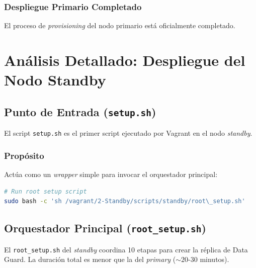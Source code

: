 \documentclass[11pt, a4paper]{report}
\begin{document}
\subsection{Despliegue Primario Completado}
El proceso de \textit{provisioning} del nodo primario está oficialmente completado.
\newpage


\chapter[Apéndice B: Despliegue Standby]{Análisis Detallado: Despliegue del Nodo Standby}

\section{Punto de Entrada (\texttt{setup.sh})}

El script \texttt{setup.sh} es el primer script ejecutado por Vagrant en el nodo \textit{standby}.
\subsection{Propósito}
Actúa como un \textit{wrapper} simple para invocar el orquestador principal:
\begin{lstlisting}[language=bash, caption={Invocación del Orquestador Standby}]
# Run root setup script
sudo bash -c 'sh /vagrant/2-Standby/scripts/standby/root\_setup.sh'
\end{lstlisting}

\section{Orquestador Principal (\texttt{root\_setup.sh})}

El \texttt{root\_setup.sh} del \textit{standby} coordina 10 etapas para crear la réplica de Data Guard.
La duración total es menor que la del \textit{primary} ($\sim 20$-$30$ minutos).
\end{document}
